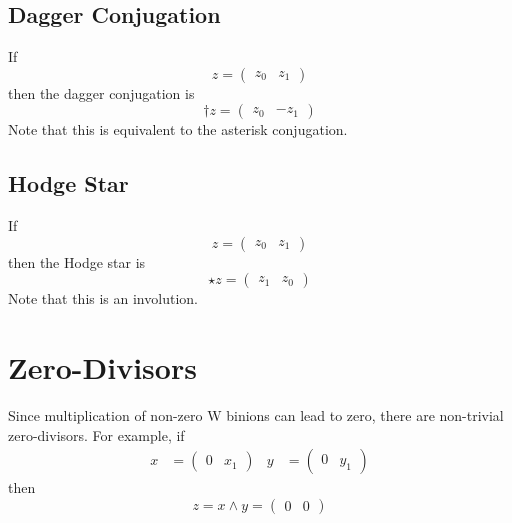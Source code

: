 \subsection{Dagger Conjugation}
If
\begin{equation}
    z = \begin{pmatrix}
        z_{0} & z_{1}
    \end{pmatrix}
\end{equation}
then the dagger conjugation is
\begin{equation}
    {\dagger z} = \begin{pmatrix}
        z_{0} & -z_{1}
    \end{pmatrix}
\end{equation}
Note that this is equivalent to the asterisk conjugation.
\subsection{Hodge Star}
If
\begin{equation}
    z = \begin{pmatrix}
        z_{0} & z_{1}
    \end{pmatrix}
\end{equation}
then the Hodge star is
\begin{equation}
    {\star z} = \begin{pmatrix}
        z_{1} & z_{0}
    \end{pmatrix}
\end{equation}
Note that this is an involution.
\section{Zero-Divisors}
Since multiplication of non-zero W binions can lead to zero, there are non-trivial zero-divisors. For example, if
\begin{align}
    x &= \begin{pmatrix}
        0 & x_{1}
    \end{pmatrix} & y &= \begin{pmatrix}
        0 & y_{1}
    \end{pmatrix}
\end{align}
then
\begin{equation}
    z = x \wedge y = \begin{pmatrix}
        0 & 0
    \end{pmatrix}
\end{equation}
